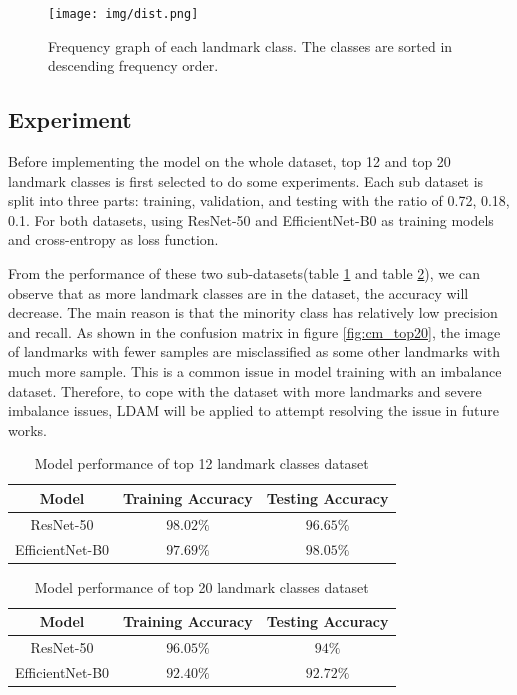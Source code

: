 \documentclass[10pt,twocolumn,letterpaper]{article}
\begin{document}
\begin{figure}
    \centering
    \texttt{[image: img/dist.png]}
    \caption{Frequency graph of each landmark class. The classes are sorted in descending frequency order.}
    \label{fig:dist_data}
\end{figure}

\subsection{Experiment}
Before implementing the model on the whole dataset, top 12 and top 20 landmark classes is first selected to do some experiments. Each sub dataset is split into three parts: training, validation, and testing with the ratio of 0.72, 0.18, 0.1. For both datasets, using ResNet-50 and EfficientNet-B0 as training models and cross-entropy as loss function.

From the performance of these two sub-datasets(table \ref{tab:table1} and table \ref{tab:table2}), we can observe that as more landmark classes are in the dataset, the accuracy will decrease. The main reason is that the minority class has relatively low precision and recall. As shown in the confusion matrix in figure \ref{fig:cm_top20}, the image of landmarks with fewer samples are misclassified as some other landmarks with much more sample. This is a common issue in model training with an imbalance dataset. Therefore, to cope with the dataset with more landmarks and severe imbalance issues, LDAM will be applied to attempt resolving the issue in future works.

\begin{table}[]
    \centering
    \begin{tabular}{c c c}
        \hline Model & Training Accuracy & Testing Accuracy \\ \hline
        ResNet-50 & $98.02\%$ & $96.65\%$ \\
        EfficientNet-B0 & $97.69\%$ & $98.05\%$ \\ \hline
    \end{tabular}
    \vspace{5pt}
    \caption{Model performance of top 12 landmark classes dataset}
    \label{tab:table1}
\end{table}

\begin{table}[]
    \centering
    \begin{tabular}{c c c}
        \hline Model & Training Accuracy & Testing Accuracy \\ \hline
        ResNet-50 & $96.05\%$ & $94\%$ \\
        EfficientNet-B0 & $92.40\%$ & $92.72\%$ \\ \hline
    \end{tabular}
    \vspace{5pt}
    \caption{Model performance of top 20 landmark classes dataset}
    \label{tab:table2}
\end{table}
\end{document}
